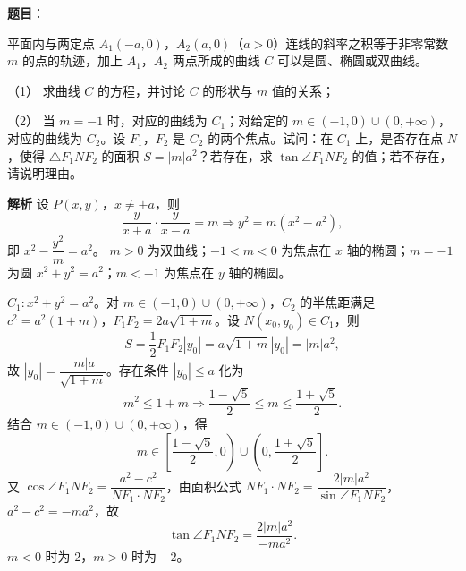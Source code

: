\begin{answer}

\textbf{题目}：

平面内与两定点 $A_1(-a,0)$，$A_2(a,0)$（$a>0$）连线的斜率之积等于非零常数 $m$ 的点的轨迹，加上 $A_1$，$A_2$ 两点所成的曲线 $C$ 可以是圆、椭圆或双曲线。

（1） 求曲线 $C$ 的方程，并讨论 $C$ 的形状与 $m$ 值的关系；

（2） 当 $m=-1$ 时，对应的曲线为 $C_1$；对给定的 $m\in(-1,0)\cup(0,+\infty)$，对应的曲线为 $C_2$。设 $F_1$，$F_2$ 是 $C_2$ 的两个焦点。试问：在 $C_1$ 上，是否存在点 $N$，使得 $\triangle F_1NF_2$ 的面积 $S=|m|a^2$？若存在，求 $\tan\angle F_1NF_2$ 的值；若不存在，请说明理由。

\textbf{解析}
设 $P(x,y)$，$x\neq\pm a$，则
\nopagebreak[4]
\[\frac{y}{x+a}\cdot\frac{y}{x-a}=m\Longrightarrow y^2=m(x^2-a^2),\]
即 $x^2-\dfrac{y^2}{m}=a^2$。
$m>0$ 为双曲线；$-1<m<0$ 为焦点在 $x$ 轴的椭圆；$m=-1$ 为圆 $x^2+y^2=a^2$；$m<-1$ 为焦点在 $y$ 轴的椭圆。

$C_1:x^2+y^2=a^2$。对 $m\in(-1,0)\cup(0,+\infty)$，$C_2$ 的半焦距满足 $c^2=a^2(1+m)$，$F_1F_2=2a\sqrt{1+m}$。设 $N(x_0,y_0)\in C_1$，则
\nopagebreak[4]
\[S=\frac12F_1F_2|y_0|=a\sqrt{1+m}|y_0|=|m|a^2,\]
故 $|y_0|=\dfrac{|m|a}{\sqrt{1+m}}$。存在条件 $|y_0|\leqslant a$ 化为
\nopagebreak[4]
\[m^2\leqslant1+m\Longrightarrow\frac{1-\sqrt5}2\leqslant m\leqslant\frac{1+\sqrt5}2.\]
结合 $m\in(-1,0)\cup(0,+\infty)$，得
\nopagebreak[4]
\[m\in\left[\frac{1-\sqrt5}2,0\right)\cup\left(0,\frac{1+\sqrt5}2\right].\]
又 $\cos\angle F_1NF_2=\dfrac{a^2-c^2}{NF_1\cdot NF_2}$，由面积公式 $NF_1\cdot NF_2=\dfrac{2|m|a^2}{\sin\angle F_1NF_2}$，$a^2-c^2=-ma^2$，故
\nopagebreak[4]
\[\tan\angle F_1NF_2=\frac{2|m|a^2}{-ma^2}.\]
$m<0$ 时为 $2$，$m>0$ 时为 $-2$。



\end{answer}